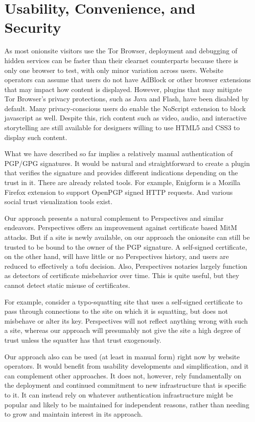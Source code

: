 \documentclass[10pt, conference, compsocconf]{styles/IEEEtran}
\begin{document}
\section{Usability, Convenience, and Security}

As most onionsite visitors use the Tor Browser, deployment and
debugging of hidden services can be faster than their clearnet
counterparts because there is only one browser to test, with only
minor variation across users.  Website operators can assume that users
do not have AdBlock or other browser extensions that may impact how
content is displayed.  However, plugins that may mitigate Tor
Browser's privacy protections, such as Java and Flash, have been
disabled by default.  Many privacy-conscious users do enable the
NoScript extension to block javascript as well.  Despite this, rich
content such as video, audio, and interactive storytelling are still
available for designers willing to use HTML5 and CSS3 to display such
content.

What we have described so far implies a relatively manual
authentication of PGP/GPG signatures. It would be natural and
straightforward to create a plugin that verifies the signature
and provides different indications depending on the trust in it.
There are already related tools. For example, Enigform is a
Mozilla Firefox extension to support OpenPGP signed HTTP requests.
And various social trust visualization tools exist.

Our approach presents a natural complement to Perspectives and similar
endeavors. Perspectives offers an improvement against
certificate based MitM attacks. But if a site is newly available,
on our approach
the onionsite can still be trusted to be bound to the owner of
the PGP signature. A self-signed certificate, on the other hand,
will have little or no
Perspectives history, and users are reduced to effectively a tofu
decision. Also, Perspectives notaries largely function as
detectors of certificate misbehavior over time. This is quite useful,
but they cannot detect static misuse of certificates.

For example, consider a typo-squatting site that uses a self-signed
certificate to pass through connections to the site on which it is
squatting, but
does not misbehave or alter its key. Perspectives will not reflect
anything wrong with such a site, whereas our approach will presumably
not give the site a high degree of trust unless the squatter has
that trust exogenously.

Our approach also can be used (at least in manual form) right now by
website operators. It would benefit from usability developments
and simplification, and it can complement other approaches. It does not,
however,
rely fundamentally on the deployment and continued commitment to new
infrastructure that is specific to it.  It can instead
rely on whatever authentication infrastructure might be popular
and likely to be maintained for independent reasons, rather than
needing to grow and maintain interest in its approach.
\end{document}
